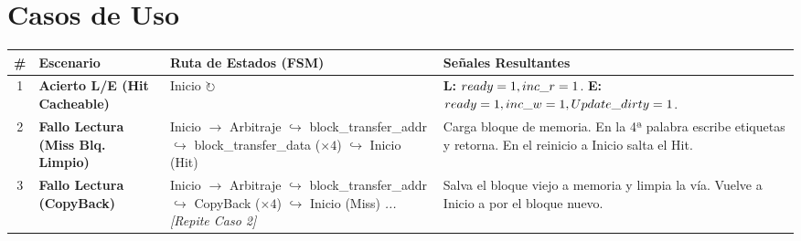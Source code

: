 \documentclass[12pt,a4paper]{article}
\begin{document}
    \section{Casos de Uso}

    \begin{table}[H]
    \centering
    \renewcommand{\arraystretch}{1.7} 
    \begin{tabularx}{\textwidth}{@{} c >{\bfseries}p{3cm} >{\small\ttfamily}X p{4cm} @{}}
    \toprule
    \textbf{\#} & \textbf{Escenario} & \normalfont\textbf{Ruta de Estados (FSM)} & \textbf{Señales Resultantes} \\
    \midrule

    1 & Acierto L/E \newline (Hit Cacheable) & 
    Inicio $\circlearrowright$ & 
    \textbf{L:} $ready=1,\newline inc\_r=1$. \newline 
    \textbf{E:} $ready=1,\newline inc\_w=1,\newline Update\_dirty=1$. \\
    \midrule

    2 & Fallo Lectura \newline (Miss Blq. Limpio) & 
    Inicio $\rightarrow$ Arbitraje \newline
    $\hookrightarrow$ block\_transfer\_addr \newline
    $\hookrightarrow$ block\_transfer\_data ($\times 4$) \newline
    $\hookrightarrow$ Inicio (Hit) & 
    Carga bloque de memoria. En la 4ª palabra escribe etiquetas y retorna. En el reinicio a Inicio salta el Hit. \\
    \midrule

    3 & Fallo Lectura \newline (CopyBack) & 
    Inicio $\rightarrow$ Arbitraje \newline
    $\hookrightarrow$ block\_transfer\_addr \newline
    $\hookrightarrow$ CopyBack ($\times 4$) \newline
    $\hookrightarrow$ Inicio (Miss) \newline
    \normalfont\textit{... [Repite Caso 2]} & 
    Salva el bloque viejo a memoria y limpia la vía. Vuelve a Inicio a por el bloque nuevo. \\
    \midrule


\end{tabularx}
\end{table}
\end{document}
